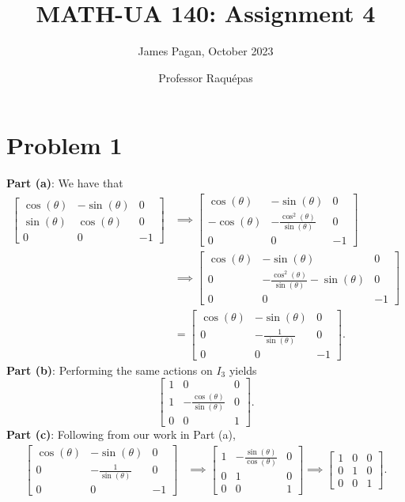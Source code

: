 \documentclass[11pt]{article}
\title{MATH-UA 140: Assignment 4}
\author{James Pagan, October 2023}
\date{Professor Raquépas}
\begin{document}
\maketitle
\tableofcontents


\section{Problem 1}

\textbf{Part (a)}: We have that 
\begin{align*}
	\begin{bmatrix} \cos(\theta) & -\sin(\theta) & 0 \\ \sin(\theta) & \cos(\theta) & 0 \\ 0 & 0 & -1 \end{bmatrix} &\implies \begin{bmatrix} \cos(\theta) & -\sin(\theta) & 0 \\ -\cos(\theta) & -\frac{\cos^{2}(\theta)}{\sin(\theta)} & 0 \\ 0 & 0 & -1 \end{bmatrix} \\
	&\implies  \begin{bmatrix} \cos(\theta) & -\sin(\theta) & 0 \\ 0 & -\frac{\cos^{2}(\theta)}{\sin(\theta)} - \sin(\theta) & 0 \\ 0 & 0 & -1 \end{bmatrix} \\
	&= \begin{bmatrix} \cos(\theta) & -\sin(\theta) & 0 \\ 0 & -\frac{1}{\sin(\theta)} & 0 \\ 0 & 0 & -1 \end{bmatrix}.
\end{align*}
\textbf{Part (b)}: Performing the same actions on $I_{3}$ yields
\[
	\begin{bmatrix} 1 & 0 & 0 \\ 1 & -\frac{\cos(\theta)}{\sin(\theta)} & 0 \\ 0 & 0 & 1 \end{bmatrix}.
\]
\textbf{Part (c)}: Following from our work in Part (a),
\begin{align*}
	\begin{bmatrix} \cos(\theta) & -\sin(\theta) &  0 \\ 0 & -\frac{1}{\sin(\theta)} & 0 \\ 0 & 0 & -1 \end{bmatrix} &\implies \begin{bmatrix} 1 & -\frac{\sin(\theta)}{\cos(\theta)} & 0 \\ 0 & 1 & 0 \\ 0 & 0 & 1 \end{bmatrix} \implies \begin{bmatrix} 1 & 0 & 0 \\ 0 & 1 & 0 \\ 0 & 0 & 1 \end{bmatrix}.
\end{align*}
\end{document}
